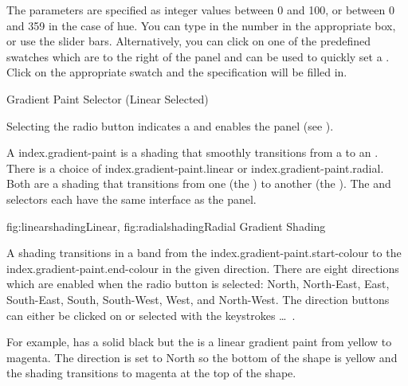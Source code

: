 The parameters are specified as integer values between 0 and 100,
or between 0 and 359 in the case of hue.
You can type in the number in the appropriate box, or use
the slider bars. Alternatively, you can click on one of the predefined swatches
which are to the right of the  panel 
and can be used to quickly set a . Click on the 
appropriate swatch and the  specification will be
filled in.


{}
{Gradient Paint Selector (Linear Selected)}

Selecting the  radio button indicates a 
 and enables the
 panel (see
). 

A \gls{index.gradient-paint} is a shading that smoothly transitions
from a  to an
.  There is a choice
of \gls{index.gradient-paint.linear} or
\gls{index.gradient-paint.radial}. Both are a shading that
transitions from one  (the
) to another (the
).  The
 and  selectors
each have the same interface as the  panel.

{
 {fig:linearshading}{}{Linear},
 {fig:radialshading}{}{Radial}
}
{Gradient Shading}


A  shading transitions in
a band from the \gls{index.gradient-paint.start-colour} to the
\gls{index.gradient-paint.end-colour} in the given direction. There
are eight directions which are enabled when the
 radio button is selected: North, North-East,
East, South-East, South, South-West, West, and North-West.  The
direction buttons can either be clicked on or selected with the
keystrokes  \ldots\
.

For example,  has a solid black
 but the  is a linear
gradient paint from yellow to magenta. The direction is set to North
so the bottom of the shape is yellow and the shading transitions to
magenta at the top of the shape.

